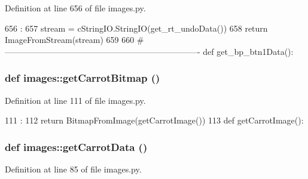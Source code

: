 Definition at line 656 of file images.py.


\begin{DoxyCode}
656                       :
657     stream = cStringIO.StringIO(get_rt_undoData())
658     return ImageFromStream(stream)
659 
660 #----------------------------------------------------------------------
def get_bp_btn1Data():
\end{DoxyCode}
\hypertarget{namespaceimages_a21763b23d7a07a8f68d362ab483d8e31}{
\subsubsection[{getCarrotBitmap}]{\setlength{\rightskip}{0pt plus 5cm}def images::getCarrotBitmap ()}}
\label{namespaceimages_a21763b23d7a07a8f68d362ab483d8e31}


Definition at line 111 of file images.py.


\begin{DoxyCode}
111                      :
112     return BitmapFromImage(getCarrotImage())
113 
def getCarrotImage():
\end{DoxyCode}
\hypertarget{namespaceimages_aedc3647002720cac060bed8930d0fa98}{
\subsubsection[{getCarrotData}]{\setlength{\rightskip}{0pt plus 5cm}def images::getCarrotData ()}}
\label{namespaceimages_aedc3647002720cac060bed8930d0fa98}


Definition at line 85 of file images.py.


